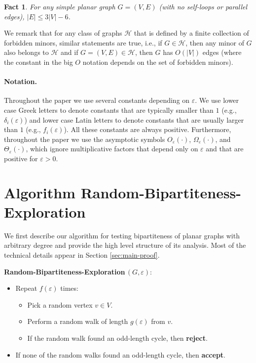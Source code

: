 \documentclass[11pt]{article}
\newtheorem{fact}[theorem]{Fact}
\newcommand{\eps}{\ensuremath{\epsilon}}
\def\epsilon{\ensuremath{\varepsilon}}
\newcommand{\RBE}{{\bf Random-Bipartiteness-Exploration}}
\begin{document}
\begin{fact}
\label{fact:planar_limited_edges}
For any simple planar graph $G = (V,E)$ (with no self-loops or parallel edges), $|E| \le 3|V|-6$.
\end{fact}

We remark that for any class of graphs $\mathcal{H}$ that is defined by a finite collection of forbidden minors, similar statements are true, i.e., if $G \in \mathcal{H}$, then any minor of $G$ also belongs to $\mathcal{H}$ and if $G = (V,E) \in \mathcal{H}$, then $G$ has $O(|V|)$ edges (where the constant in the big $O$ notation depends on the set of forbidden minors).



\paragraph{Notation.}

Throughout the paper we use several constants depending on $\eps$. We use lower case Greek letters to denote constants that are typically smaller than $1$ (e.g., $\delta_i(\eps)$) and lower case Latin letters to denote constants that are usually larger than $1$ (e.g., $f_i(\eps)$). All these constants are always positive.
Furthermore, throughout the paper we use the asymptotic symbols $O_{\eps}(\cdot)$, $\Omega_{\eps}(\cdot)$, and $\Theta_{\eps}(\cdot)$, which ignore multiplicative factors that depend only on $\eps$ and that
are positive for $\eps>0$.



\section{Algorithm \RBE}

We first describe our algorithm for testing bipartiteness of planar graphs with arbitrary degree and provide the high level structure of its analysis. Most of the technical details appear in Section \ref{sec:main-proof}.

\medskip
\begin{algo}
\RBE\,$(G,\eps)$:
\begin{itemize}
\item Repeat $f(\eps)$ times:
    \begin{itemize}[$\circ$]
    \item Pick a random vertex $v \in V$.
    \item Perform a random walk of length $g(\eps)$ from $v$.
    \item If the random walk found an odd-length cycle, then \textbf{reject}.
    \end{itemize}
\item If none of the random walks found an odd-length cycle, then \textbf{accept}.
\end{itemize}
\end{algo}
\end{document}
